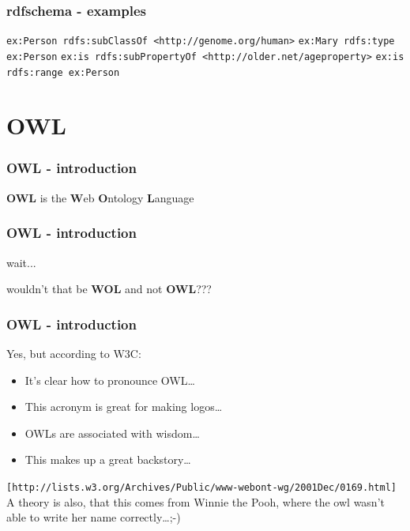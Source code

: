 \documentclass[handout]{beamer}
\begin{document}
       \begin{frame}
           \frametitle{rdfschema - examples}

           \texttt{ex:Person    rdfs:subClassOf     <http://genome.org/human>}
           \vskip 0.3cm
           \pause
           \texttt{ex:Mary    rdfs:type     ex:Person}
           \vskip 0.3cm
           \pause
           \texttt{ex:is    rdfs:subPropertyOf    <http://older.net/ageproperty>}
           \vskip 0.3cm
           \pause
           \texttt{ex:is    rdfs:range      ex:Person}
       \end{frame}

    \section{OWL}

       \begin{frame}
           \frametitle{OWL - introduction}

           \textbf{OWL} is the \textbf{W}eb \textbf{O}ntology \textbf{L}anguage
      \end{frame}

      \begin{frame}
           \frametitle{OWL - introduction}

           wait...
           
           wouldn't that be \textbf{WOL} and not \textbf{OWL}???
     \end{frame}

     \begin{frame}
           \frametitle{OWL - introduction}
           Yes, but according to W3C:
           \vskip 0.7cm
           \pause
           \begin{itemize}
               \item It's clear how to pronounce OWL\ldots
               \pause
               \item This acronym is great for making logos\ldots
               \pause
               \item OWLs are associated with wisdom\ldots
               \pause
               \item This makes up a great backstory\ldots
               \pause
           \end{itemize}
           \footnotesize  %
           \texttt{[http://lists.w3.org/Archives/Public/www-webont-wg/2001Dec/0169.html]} 
           \normalsize
           \pause
           \vskip 0.7cm
           A theory is also, that this comes from Winnie the Pooh, where the owl wasn't able to
           write her name correctly\ldots ;-)
     \end{frame}
 
\end{document}

